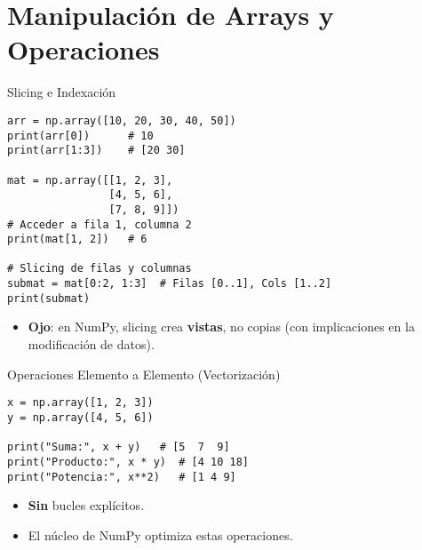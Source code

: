 \documentclass[10pt]{beamer}
\begin{document}
\section{Manipulación de Arrays y Operaciones}

\begin{frame}[fragile]{Slicing e Indexación}
\begin{verbatim}
arr = np.array([10, 20, 30, 40, 50])
print(arr[0])      # 10
print(arr[1:3])    # [20 30]

mat = np.array([[1, 2, 3],
                [4, 5, 6],
                [7, 8, 9]])
# Acceder a fila 1, columna 2
print(mat[1, 2])   # 6

# Slicing de filas y columnas
submat = mat[0:2, 1:3]  # Filas [0..1], Cols [1..2]
print(submat)
\end{verbatim}
\begin{itemize}
  \item \textbf{Ojo}: en NumPy, slicing crea \textbf{vistas}, no copias (con implicaciones en la modificación de datos).
\end{itemize}
\end{frame}

\begin{frame}[fragile]{Operaciones Elemento a Elemento (Vectorización)}
\begin{verbatim}
x = np.array([1, 2, 3])
y = np.array([4, 5, 6])

print("Suma:", x + y)   # [5  7  9]
print("Producto:", x * y)  # [4 10 18]
print("Potencia:", x**2)   # [1 4 9]
\end{verbatim}
\begin{itemize}
  \item \textbf{Sin} bucles explícitos.
  \item El núcleo de NumPy optimiza estas operaciones.
\end{itemize}
\end{frame}
\end{document}
